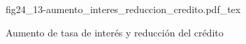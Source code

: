 \begin{figure}[h]
\centering
\def\svgwidth{0.5\textwidth}
{fig24_13-aumento_interes_reduccion_credito.pdf_tex}
\caption{Aumento de tasa de interés y reducción del crédito}
\label{fig24_13-aumento_interes_reduccion_credito}
\end{figure}